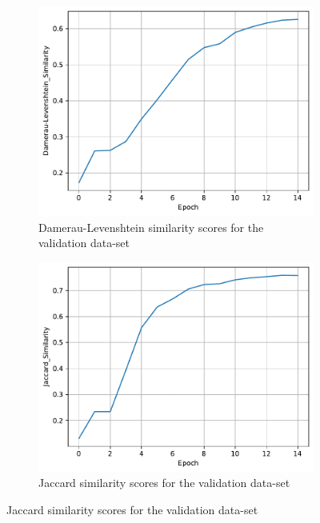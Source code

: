 \documentclass[11pt]{article}
\begin{document}
\begin{figure}[H]
    \vspace{1cm}

    \hspace{0.025\linewidth}
    \begin{subfigure}{0.45\linewidth}
        \centering
        \includegraphics[width=\linewidth]{../data/q3/2/damerau-levenshtein_similarity__val.pdf}
        \caption{Damerau-Levenshtein similarity scores for the validation data-set}
    \end{subfigure}
    \hspace{0.05\linewidth}
    \begin{subfigure}{0.45\linewidth}
        \centering
        \includegraphics[width=\linewidth]{../data/q3/2/jaccard_similarity__val.pdf}
        \caption{Jaccard similarity scores for the validation data-set}
    \end{subfigure}
\end{figure}
\end{document}
